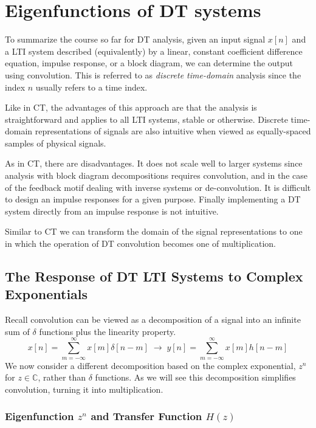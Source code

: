 \chapter{Eigenfunctions of DT systems}
To summarize the course so far for DT analysis, given an input signal $x[n]$ and a LTI system described (equivalently) by a linear, constant coefficient difference equation, impulse response, or a block diagram, we can determine the output using convolution. This is referred to as \emph{discrete time-domain} analysis since the index $n$ usually refers to a time index.

Like in CT, the advantages of this approach are that the analysis is straightforward and applies to all LTI systems, stable or otherwise. Discrete time-domain representations of signals are also intuitive when viewed as equally-spaced samples of physical signals.

As in CT, there are disadvantages. It does not scale well to larger systems since analysis with block diagram decompositions requires convolution, and in the case of the feedback motif dealing with inverse systems or de-convolution. It is difficult to design an impulse responses for a given purpose. Finally implementing a DT system directly from an impulse response is not intuitive.

Similar to CT we can transform the domain of the signal representations to one in which the operation of DT convolution becomes one of multiplication.

\section{The Response of DT LTI Systems to Complex Exponentials}

Recall convolution can be viewed as a decomposition of a signal into an infinite sum of $\delta$ functions plus the linearity property.
\[
x[n] = \sum\limits_{m = -\infty}^{\infty} x[m]\delta[n-m] \;\longrightarrow\; y[n] = \sum\limits_{m = -\infty}^{\infty} x[m]h[n-m]
\]  
We now consider a different decomposition based on the complex exponential, $z^n$ for $z \in \mathbb{C}$, rather than $\delta$ functions. As we will see this decomposition simplifies convolution, turning it into multiplication.

\subsection{Eigenfunction $z^n$ and Transfer Function $H(z)$}

